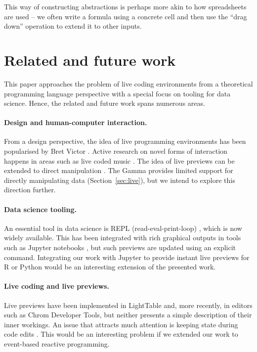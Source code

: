 \documentclass[sigplan,10pt,review,anonymous]{acmart}\settopmatter{printfolios=true,printccs=false,printacmref=false}
\theoremstyle{plain}
\theoremstyle{definition}
\begin{document}
This way of constructing abstractions is perhaps more akin to how spreadsheets are used -- we often
write a formula using a concrete cell and then use the ``drag down'' operation to extend it to 
other inputs.


\section{Related and future work}
\label{sec:future}

This paper approaches the problem of live coding environments from a theoretical programming
language perspective with a special focus on tooling for data science. Hence, the related and
future work spans numerous areas.

\paragraph{Design and human-computer interaction.}
From a design perspective, the idea of live programming environments has been popularised by 
Bret Victor \cite{learnable}. Active research on novel forms of interaction happens in areas
such as live coded music \cite{beyond,sonic}.
The idea of live previews can be extended to direct manipulation \cite{direct}. The Gamma
provides limited support for directly manipulating data (Section~\ref{sec:live}), but we 
intend to explore this direction further.

\paragraph{Data science tooling.}
An essential tool in data science is REPL (read-eval-print-loop) \cite{drscheme}, which is now
widely available. This has been integrated with rich graphical outputs in tools such as Jupyter
notebooks \cite{jupyter,ipython}, but such previews are updated using an explicit command.
Integrating our work with Jupyter to provide instant live previews for R or Python would be
an interesting extension of the presented work.

\paragraph{Live coding and live previews.}
Live previews have been implemented in LightTable \cite{lighttable} and, more recently, in
editors such as Chrom Developer Tools, but neither presents a simple description of their
inner workings. An issue that attracts much attention is keeping state during code edits
\cite{alive,livingit}. This would be an interesting problem if we extended our work to
event-based reactive programming.
\end{document}
